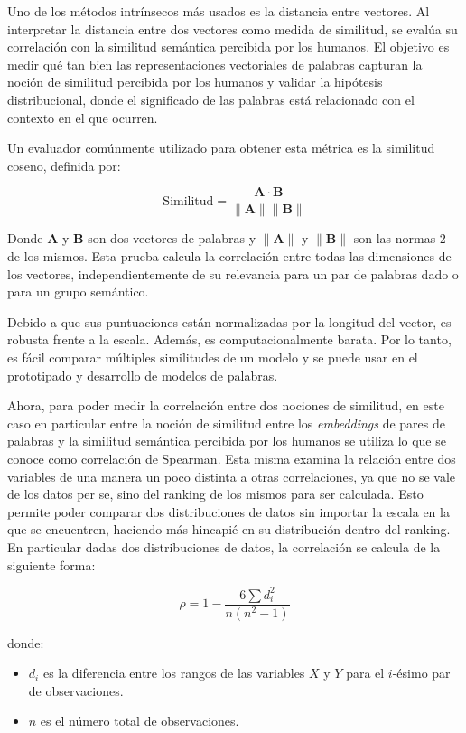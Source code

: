 Uno de los métodos intrínsecos más usados es la distancia entre vectores. Al interpretar la distancia entre dos vectores como medida de similitud, se evalúa su correlación con la similitud semántica percibida por los humanos. El objetivo es medir qué tan bien las representaciones vectoriales de palabras capturan la noción de similitud percibida por los humanos y validar la hipótesis distribucional, donde el significado de las palabras está relacionado con el contexto en el que ocurren. \parencite{Wang_2019}

Un evaluador comúnmente utilizado para obtener esta métrica es la similitud coseno, definida por:

\[
\text{Similitud} = \frac{\mathbf{A} \cdot \mathbf{B}}{\|\mathbf{A}\| \|\mathbf{B}\|}
\]

Donde \( \mathbf{A} \) y \( \mathbf{B} \) son dos vectores de palabras y \( \|\mathbf{A}\| \) y \( \|\mathbf{B}\| \) son las normas 2 de los mismos. Esta prueba calcula la correlación entre todas las dimensiones de los vectores, independientemente de su relevancia para un par de palabras dado o para un grupo semántico.

Debido a que sus puntuaciones están normalizadas por la longitud del vector, es robusta frente a la escala. Además, es computacionalmente barata. Por lo tanto, es fácil comparar múltiples similitudes de un modelo y se puede usar en el prototipado y desarrollo de modelos de palabras.

Ahora, para poder medir la correlación entre dos nociones de similitud, en este caso en particular entre la noción de similitud entre los \textit{embeddings} de pares de palabras y la similitud semántica percibida por los humanos se utiliza lo que se conoce como correlación de Spearman. Esta misma examina la relación entre dos variables de una manera un poco distinta a otras correlaciones, ya que no se vale de los datos per se, sino del ranking de los mismos para ser calculada. Esto permite poder comparar dos distribuciones de datos sin importar la escala en la que se encuentren, haciendo más hincapié en su distribución dentro del ranking. En particular dadas dos distribuciones de datos, la correlación se calcula de la siguiente forma:

\[
\rho = 1 - \frac{6 \sum d_i^2}{n(n^2 - 1)}
\]

donde:
\begin{itemize}
    \item \( d_i \) es la diferencia entre los rangos de las variables \( X \) y \( Y \) para el \( i \)-ésimo par de observaciones.
    \item \( n \) es el número total de observaciones.
\end{itemize}

